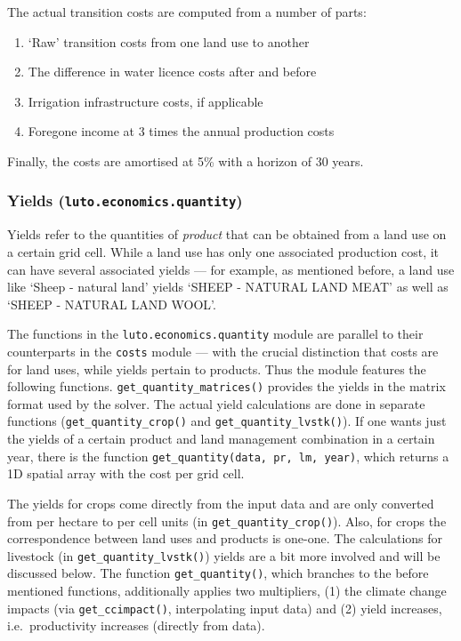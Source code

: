 \documentclass[12pt,a4paper,twoside]{article}
\begin{document}
The actual transition costs are computed from a number of parts:
\begin{enumerate}
	\item `Raw' transition costs from one land use to another
	\item The difference in water licence costs after and before
	\item Irrigation infrastructure costs, if applicable
	\item Foregone income at 3 times the annual production costs
\end{enumerate}

Finally, the costs are amortised at 5\% with a horizon of 30 years.

\subsubsection{Yields (\texttt{luto.economics.quantity})}

Yields refer to the quantities of \emph{product} that can be obtained from a land use on a certain grid cell. While a land use has only one associated production cost, it can have several associated yields --- for example, as mentioned before, a land use like `Sheep - natural land' yields `SHEEP - NATURAL LAND MEAT' as well as `SHEEP - NATURAL LAND WOOL'.

The functions in the \texttt{luto.economics.quantity} module are parallel to their counterparts in the \texttt{costs} module --- with the crucial distinction that costs are for land uses, while yields pertain to products. Thus the module features the following functions. \texttt{get_quantity_matrices()} provides the yields in the matrix format used by the solver. The actual yield calculations are done in separate functions (\texttt{get_quantity_crop()} and \texttt{get_quantity_lvstk()}). If one wants just the yields of a certain product and land management combination in a certain year, there is the function \texttt{get_quantity(data, pr, lm, year)}, which returns a 1D spatial array with the cost per grid cell.

The yields for crops come directly from the input data and are only converted from per hectare to per cell units (in \texttt{get_quantity_crop()}). Also, for crops the correspondence between land uses and products is one-one. The calculations for livestock (in \texttt{get_quantity_lvstk()}) yields are a bit more involved and will be discussed below. The function \texttt{get_quantity()}, which branches to the before mentioned functions, additionally applies two multipliers, (1) the climate change impacts (via \texttt{get_ccimpact()}, interpolating input data) and (2) yield increases, i.e.\ productivity increases (directly from data).
\end{document}
